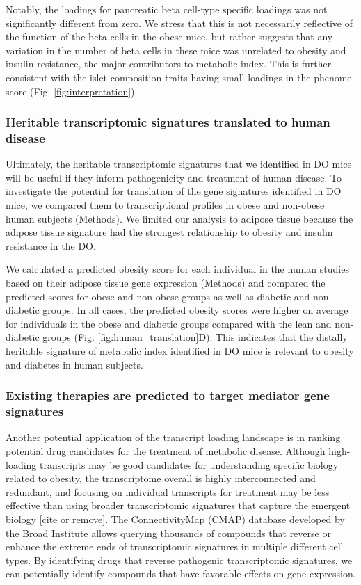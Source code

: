 \documentclass[
]{article}
\begin{document}
Notably, the loadings for pancreatic beta cell-type specific loadings
was not significantly different from zero. We stress that this is not
necessarily reflective of the function of the beta cells in the obese
mice, but rather suggests that any variation in the number of beta cells
in these mice was unrelated to obesity and insulin resistance, the major
contributors to metabolic index. This is further consistent with the
islet composition traits having small loadings in the phenome score
(Fig. \ref{fig:interpretation}).

\subsubsection{Heritable transcriptomic signatures translated to human
disease}\label{heritable-transcriptomic-signatures-translated-to-human-disease}

Ultimately, the heritable transcriptomic signatures that we identified
in DO mice will be useful if they inform pathogenicity and treatment of
human disease. To investigate the potential for translation of the gene
signatures identified in DO mice, we compared them to transcriptional
profiles in obese and non-obese human subjects (Methods). We limited our
analysis to adipose tissue because the adipose tissue signature had the
strongest relationship to obesity and insulin resistance in the DO.

We calculated a predicted obesity score for each individual in the human
studies based on their adipose tissue gene expression (Methods) and
compared the predicted scores for obese and non-obese groups as well as
diabetic and non-diabetic groups. In all cases, the predicted obesity
scores were higher on average for individuals in the obese and diabetic
groups compared with the lean and non-diabetic groups (Fig.
\ref{fig:human_translation}D). This indicates that the distally
heritable signature of metabolic index identified in DO mice is relevant
to obesity and diabetes in human subjects.

\subsubsection{Existing therapies are predicted to target mediator gene
signatures}\label{existing-therapies-are-predicted-to-target-mediator-gene-signatures}

Another potential application of the transcript loading landscape is in
ranking potential drug candidates for the treatment of metabolic
disease. Although high-loading transcripts may be good candidates for
understanding specific biology related to obesity, the transcriptome
overall is highly interconnected and redundant, and focusing on
individual transcripts for treatment may be less effective than using
broader transcriptomic signatures that capture the emergent biology
{[}cite or remove{]}. The ConnectivityMap (CMAP) database
\cite{pmid17008526} developed by the Broad Institute allows querying
thousands of compounds that reverse or enhance the extreme ends of
transcriptomic signatures in multiple different cell types. By
identifying drugs that reverse pathogenic transcriptomic signatures, we
can potentially identify compounds that have favorable effects on gene
expression.
\end{document}
